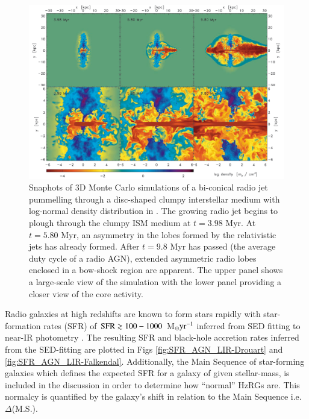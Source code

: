 \begin{figure}[!ht]
  \centering
  \includegraphics[width=\textwidth]{plots_chp1/jet_gas_sims_Gaibler_2011.png}
  \caption[Simulation snapshots of bi-conical radio jet from \citet{Gaibler2011}]{Snaphots of 3D Monte Carlo simulations of a bi-conical radio jet pummelling through a disc-shaped clumpy interstellar medium with log-normal density distribution in \citet{Gaibler2011}. The growing radio jet begins to plough through the clumpy ISM medium at $t=3.98$ Myr. At $t=5.80$ Myr, an asymmetry in the lobes formed by the relativistic jets has already formed. After $t=9.8$ Myr has passed (the average duty cycle of a radio AGN), extended asymmetric radio lobes enclosed in a bow-shock region are apparent. The upper panel shows a large-scale view of the simulation with the lower panel providing a closer view of the core activity.}
  \label{fig:jet-ism-Gaibler2011}
\end{figure}

Radio galaxies at high redshifts are known to form stars rapidly with star-formation rates (SFR) of $\rm SFR \gtrsim 100 - 1000$ M$_\odot \rm yr^{-1}$ inferred from SED fitting to near-IR photometry \citep{Drouart2014,falkendal2019}. The resulting SFR and black-hole accretion rates inferred from the SED-fitting are plotted in Figs \ref{fig:SFR_AGN_LIR-Drouart} and \ref{fig:SFR_AGN_LIR-Falkendal}. Additionally, the Main Sequence of star-forming galaxies which defines the expected SFR for a galaxy of given stellar-mass, is included in the discussion in order to determine how ``normal'' HzRGs are. This normalcy is quantified by the galaxy's shift in relation to the Main Sequence i.e. $\Delta$(M.S.). 

